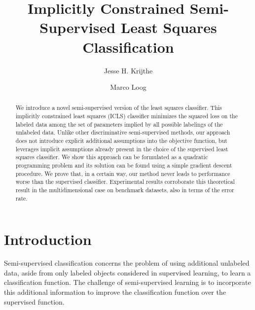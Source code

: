 \documentclass{llncs}
\begin{document}
\title{Implicitly Constrained Semi-Supervised Least Squares Classification}

\author{Jesse H. Krijthe \and Marco Loog}

\maketitle
\begin{abstract}
We introduce a novel semi-supervised version of the least squares classifier.
This implicitly constrained least squares (ICLS) classifier minimizes the squared loss on the labeled data among the set of parameters implied by all possible labelings of the unlabeled data.
Unlike other discriminative semi-supervised methods, our approach does not introduce explicit additional assumptions into the objective function, but leverages implicit assumptions already present in the choice of the supervised least squares classifier.
We show this approach can be formulated as a quadratic programming problem and its solution can be found using a simple gradient descent procedure. 
We prove that, in a certain way, our method never leads to performance worse than the supervised classifier.
Experimental results corroborate this theoretical result in the multidimensional case on benchmark datasets, also in terms of the error rate.
\end{abstract}

\section{Introduction}
Semi-supervised classification concerns the problem of using additional unlabeled data, aside from only labeled objects considered in supervised learning, to learn a classification function.
The challenge of semi-supervised learning is to incorporate this additional information to improve the classification function over the supervised function.
\end{document}
